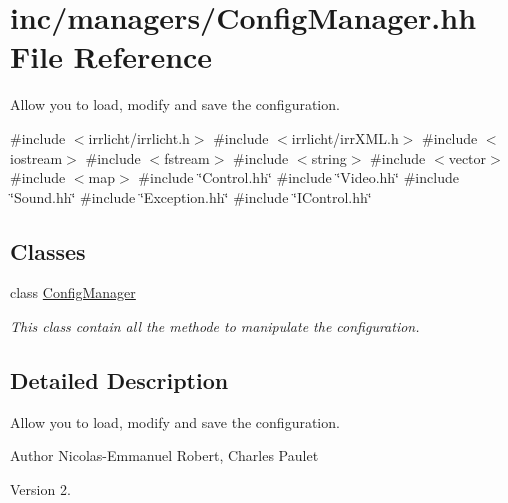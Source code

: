 \hypertarget{ConfigManager_8hh}{}\section{inc/managers/\+Config\+Manager.hh File Reference}
\label{ConfigManager_8hh}


Allow you to load, modify and save the configuration.  


{\ttfamily \#include $<$irrlicht/irrlicht.\+h$>$}\newline
{\ttfamily \#include $<$irrlicht/irr\+X\+M\+L.\+h$>$}\newline
{\ttfamily \#include $<$iostream$>$}\newline
{\ttfamily \#include $<$fstream$>$}\newline
{\ttfamily \#include $<$string$>$}\newline
{\ttfamily \#include $<$vector$>$}\newline
{\ttfamily \#include $<$map$>$}\newline
{\ttfamily \#include \char`\"{}Control.\+hh\char`\"{}}\newline
{\ttfamily \#include \char`\"{}Video.\+hh\char`\"{}}\newline
{\ttfamily \#include \char`\"{}Sound.\+hh\char`\"{}}\newline
{\ttfamily \#include \char`\"{}Exception.\+hh\char`\"{}}\newline
{\ttfamily \#include \char`\"{}I\+Control.\+hh\char`\"{}}\newline
\subsection*{Classes}
\begin{DoxyCompactItemize}
\item 
class \hyperlink{classConfigManager}{Config\+Manager}
\begin{DoxyCompactList}\small\item\em This class contain all the methode to manipulate the configuration. \end{DoxyCompactList}\end{DoxyCompactItemize}


\subsection{Detailed Description}
Allow you to load, modify and save the configuration. 

\begin{DoxyAuthor}{Author}
Nicolas-\/\+Emmanuel Robert, Charles Paulet 
\end{DoxyAuthor}
\begin{DoxyVersion}{Version}
2. 
\end{DoxyVersion}
